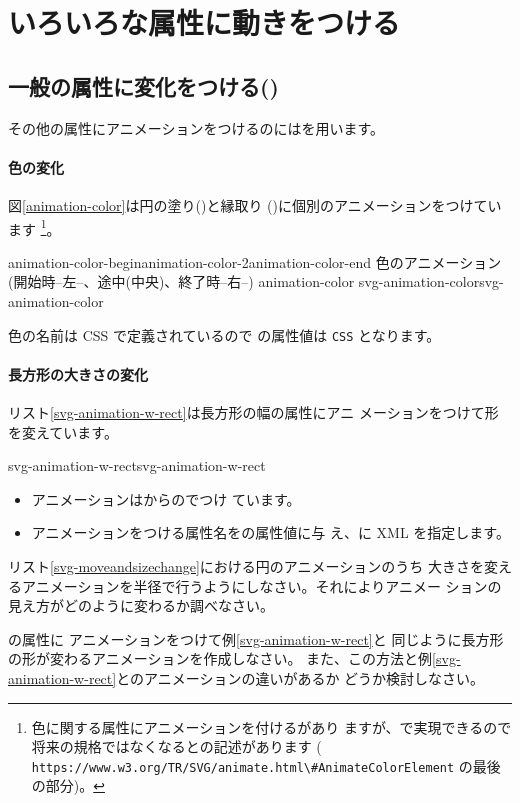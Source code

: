 \section{いろいろな属性に動きをつける}
\subsection{一般の属性に変化をつける()}\label{animationbyanimate}
その他の属性にアニメーションをつけるのにはを用います。
\paragraph{色の変化}
\hspace{-0.5em}図\ref{animation-color}は円の塗り()と縁取り
()に個別のアニメーションをつけています
\footnote{色に関する属性にアニメーションを付けるがあり
ますが、で実現できるので
将来の規格ではなくなるとの記述があります
(%
{\Verb+https://www.w3.org/TR/SVG/animate.html\#AnimateColorElement+}
の最後の部分)。}。

{{animation-color-begin}{animation-color-2}{animation-color-end}}
{色のアニメーション(開始時--左--、途中(中央)、終了時--右--)}
{animation-color}
{svg-animation-color}{svg-animation-color}

色の名前は CSS で定義されているので  の属性値は
\texttt{CSS} となります。%

\paragraph{長方形の大きさの変化}
リスト\ref{svg-animation-w-rect}は長方形の幅の属性にアニ
メーションをつけて形を変えています。

{svg-animation-w-rect}{svg-animation-w-rect}
\begin{itemize}
 \item アニメーションはからのでつけ
       ています。
 \item アニメーションをつける属性名をの属性値に与
       え、に XML を指定します。
\end{itemize}
\begin{Problem}\upshape
 リスト\ref{svg-moveandsizechange}における円のアニメーションのうち
大きさを変えるアニメーションを半径で行うようにしなさい。それによりアニメー
 ションの見え方がどのように変わるか調べなさい。
\end{Problem}
\begin{Problem}\upshape{}の属性に
 アニメーションをつけて例\ref{svg-animation-w-rect}と
 同じように長方形の形が変わるアニメーションを作成しなさい。
また、この方法と例\ref{svg-animation-w-rect}とのアニメーションの違いがあるか
 どうか検討しなさい。
\end{Problem}
